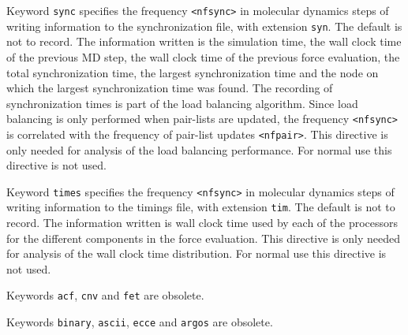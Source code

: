 \begin{description}
%
%
%

Keyword \verb+sync+
specifies the frequency  \verb+<nfsync>+ in molecular dynamics steps
of writing information to the synchronization file, with extension
\verb+syn+. 
The default is not to record.
The information written is the simulation time, the wall clock time
of the previous MD step, the wall clock time of the previous force
evaluation, the total synchronization time, the largest
synchronization time and the node on which the largest synchronization
time was found. The recording of synchronization times is part of the
load balancing algorithm. Since load balancing is only performed when
pair-lists are updated, the frequency \verb+<nfsync>+ is correlated
with the frequency of pair-list updates \verb+<nfpair>+. This directive
is only needed for analysis of the load balancing performance. For 
normal use this directive is not used.

Keyword \verb+times+
specifies the frequency  \verb+<nfsync>+ in molecular dynamics steps
of writing information to the timings file, with extension
\verb+tim+. 
The default is not to record.
The information written is wall clock time used by each of the
processors for the different components in the force evaluation.
This directive is only needed for analysis of the wall clock time
distribution. For normal use this directive is not used.

Keywords \verb+acf+, \verb+cnv+ and \verb+fet+ are obsolete.

Keywords \verb+binary+, \verb+ascii+, \verb+ecce+ and \verb+argos+ are obsolete.

\end{description}

